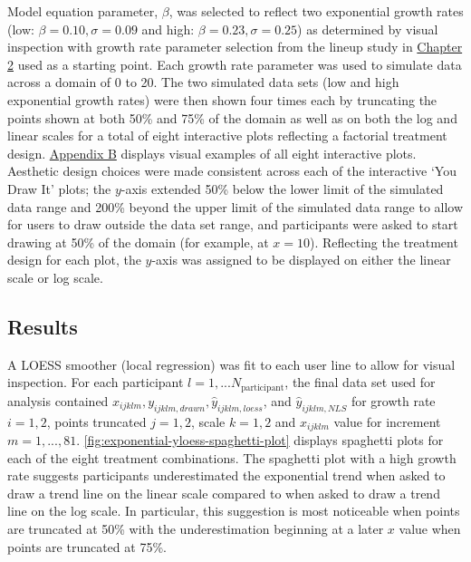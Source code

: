 \documentclass[print]{nuthesis}
\begin{document}
Model equation parameter, \(\beta\), was selected to reflect two exponential growth rates (low: \(\beta = 0.10, \sigma = 0.09\) and high: \(\beta = 0.23, \sigma = 0.25\)) as determined by visual inspection with growth rate parameter selection from the lineup study in \protect\hyperlink{lineups-parameter-selection}{Chapter 2} used as a starting point.
Each growth rate parameter was used to simulate data across a domain of 0 to 20.
The two simulated data sets (low and high exponential growth rates) were then shown four times each by truncating the points shown at both 50\% and 75\% of the domain as well as on both the log and linear scales for a total of eight interactive plots reflecting a factorial treatment design.
\protect\hyperlink{exponential-prediction-plots}{Appendix B} displays visual examples of all eight interactive plots.
Aesthetic design choices were made consistent across each of the interactive `You Draw It' plots; the \(y\)-axis extended 50\% below the lower limit of the simulated data range and 200\% beyond the upper limit of the simulated data range to allow for users to draw outside the data set range, and participants were asked to start drawing at 50\% of the domain (for example, at \(x = 10\)).
Reflecting the treatment design for each plot, the \(y\)-axis was assigned to be displayed on either the linear scale or log scale.

\hypertarget{results-2}{%
\subsection{Results}\label{results-2}}

A LOESS smoother (local regression) was fit to each user line to allow for visual inspection.
For each participant \(l = 1,...N_\text{participant}\), the final data set used for analysis contained \(x_{ijklm}, y_{ijklm,drawn}, \hat y_{ijklm,loess}\), and \(\hat y_{ijklm,NLS}\) for growth rate \(i = 1,2\), points truncated \(j = 1,2\), scale \(k = 1,2\) and \(x_{ijklm}\) value for increment \(m = 1, ...,81\).
\cref{fig:exponential-yloess-spaghetti-plot} displays spaghetti plots for each of the eight treatment combinations.
The spaghetti plot with a high growth rate suggests participants underestimated the exponential trend when asked to draw a trend line on the linear scale compared to when asked to draw a trend line on the log scale.
In particular, this suggestion is most noticeable when points are truncated at 50\% with the underestimation beginning at a later \(x\) value when points are truncated at 75\%.
\end{document}
